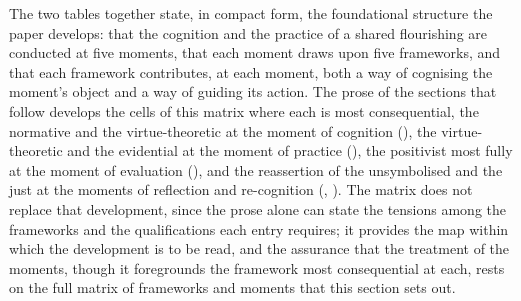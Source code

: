 The two tables together state, in compact form, the foundational structure the paper develops: that the cognition and the practice of a shared flourishing are conducted at five moments, that each moment draws upon five frameworks, and that each framework contributes, at each moment, both a way of cognising the moment's object and a way of guiding its action. The prose of the sections that follow develops the cells of this matrix where each is most consequential, the normative and the virtue-theoretic at the moment of cognition (), the virtue-theoretic and the evidential at the moment of practice (), the positivist most fully at the moment of evaluation (), and the reassertion of the unsymbolised and the just at the moments of reflection and re-cognition (, ). The matrix does not replace that development, since the prose alone can state the tensions among the frameworks and the qualifications each entry requires; it provides the map within which the development is to be read, and the assurance that the treatment of the moments, though it foregrounds the framework most consequential at each, rests on the full matrix of frameworks and moments that this section sets out.
